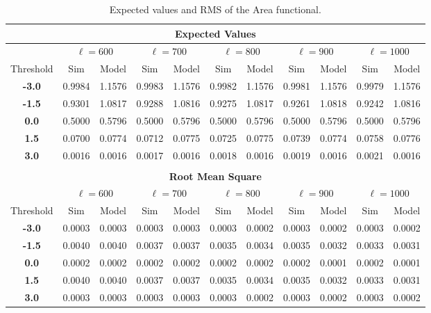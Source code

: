\documentclass[aps,prd,showpacs,superscriptaddress,groupedaddress]{revtex4-1}  %
\begin{document}
\begin{table}
\centering
\begin{tabular}{|c||c|c|c|c|c|c|c|c|c|c|}
\multicolumn{11}{c}{\textbf{Expected Values}}   \\
\hline 
& \multicolumn{2}{c|}{$\ell=600$} & \multicolumn{2}{c|}{$\ell=700$} & \multicolumn{2}{c|}{$\ell=800$} & \multicolumn{2}{c|}{$\ell=900$} & \multicolumn{2}{c|}{$\ell=1000$}\\ 
 \hline
Threshold & Sim & Model & Sim & Model & Sim & Model & Sim & Model & Sim & Model\\ 
 \hline
\textbf{-3.0} & 0.9984 & 1.1576 & 0.9983 & 1.1576 & 0.9982 & 1.1576 & 0.9981 & 1.1576 & 0.9979 & 1.1576\\
\textbf{-1.5} & 0.9301 & 1.0817 & 0.9288 & 1.0816 & 0.9275 & 1.0817 & 0.9261 & 1.0818 & 0.9242 & 1.0816\\
\textbf{0.0} & 0.5000 & 0.5796 & 0.5000 & 0.5796 & 0.5000 & 0.5796 & 0.5000 & 0.5796 & 0.5000 & 0.5796\\
\textbf{1.5} & 0.0700 & 0.0774 & 0.0712 & 0.0775 & 0.0725 & 0.0775 & 0.0739 & 0.0774 & 0.0758 & 0.0776\\
\textbf{3.0} & 0.0016 & 0.0016 & 0.0017 & 0.0016 & 0.0018 & 0.0016 & 0.0019 & 0.0016 & 0.0021 & 0.0016\\

\hline 
\multicolumn{11}{c}{}   \\
\multicolumn{11}{c}{\textbf{Root Mean Square}}   \\
\hline 

& \multicolumn{2}{c|}{$\ell=600$} & \multicolumn{2}{c|}{$\ell=700$} & \multicolumn{2}{c|}{$\ell=800$} & \multicolumn{2}{c|}{$\ell=900$} & \multicolumn{2}{c|}{$\ell=1000$}\\ 
 \hline
Threshold & Sim & Model & Sim & Model & Sim & Model & Sim & Model & Sim & Model\\ 
 \hline
\textbf{-3.0} & 0.0003 & 0.0003 & 0.0003 & 0.0003 & 0.0003 & 0.0002 & 0.0003 & 0.0002 & 0.0003 & 0.0002\\
\textbf{-1.5} & 0.0040 & 0.0040 & 0.0037 & 0.0037 & 0.0035 & 0.0034 & 0.0035 & 0.0032 & 0.0033 & 0.0031\\
\textbf{0.0} & 0.0002 & 0.0002 & 0.0002 & 0.0002 & 0.0002 & 0.0002 & 0.0002 & 0.0001 & 0.0002 & 0.0001\\
\textbf{1.5} & 0.0040 & 0.0040 & 0.0037 & 0.0037 & 0.0035 & 0.0034 & 0.0035 & 0.0032 & 0.0033 & 0.0031\\
\textbf{3.0} & 0.0003 & 0.0003 & 0.0003 & 0.0003 & 0.0003 & 0.0002 & 0.0003 & 0.0002 & 0.0003 & 0.0002\\
\hline 
\end{tabular} \\
\caption{Expected values and RMS of the Area functional.}  \\
\label{tab:area_mean_rms} \\
\end{table}
\end{document}
